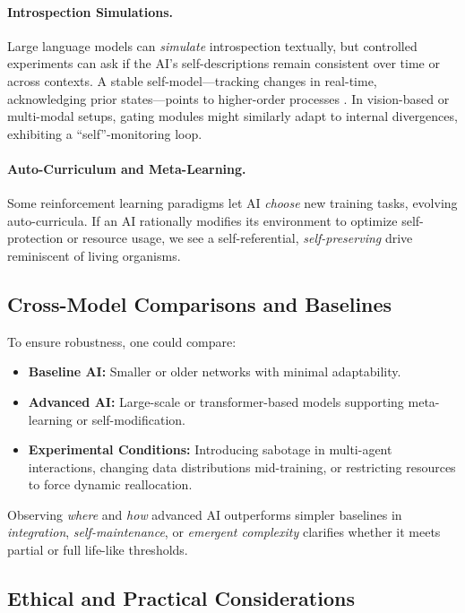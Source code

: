 \documentclass[12pt]{article}
\begin{document}
\paragraph{Introspection Simulations.}
Large language models can \textit{simulate} introspection textually, but
controlled experiments can ask if the AI’s self-descriptions remain consistent
over time or across contexts. A stable self-model—tracking changes in real-time,
acknowledging prior states—points to higher-order processes \cite{Rosenthal2002}.
In vision-based or multi-modal setups, gating modules might similarly adapt to
internal divergences, exhibiting a “self”-monitoring loop.

\paragraph{Auto-Curriculum and Meta-Learning.}
Some reinforcement learning paradigms let AI \emph{choose} new training tasks,
evolving auto-curricula. If an AI rationally modifies its environment to optimize
self-protection or resource usage, we see a self-referential, \emph{self-preserving}
drive reminiscent of living organisms.

\subsection{Cross-Model Comparisons and Baselines}

To ensure robustness, one could compare:
\begin{itemize}
    \item \textbf{Baseline AI:} Smaller or older networks with minimal adaptability.
    \item \textbf{Advanced AI:} Large-scale or transformer-based models supporting
          meta-learning or self-modification.
    \item \textbf{Experimental Conditions:} Introducing sabotage in multi-agent
          interactions, changing data distributions mid-training, or restricting
          resources to force dynamic reallocation.
\end{itemize}
Observing \emph{where} and \emph{how} advanced AI outperforms simpler baselines
in \emph{integration}, \emph{self-maintenance}, or \emph{emergent complexity}
clarifies whether it meets partial or full life-like thresholds.

\subsection{Ethical and Practical Considerations}
\end{document}
